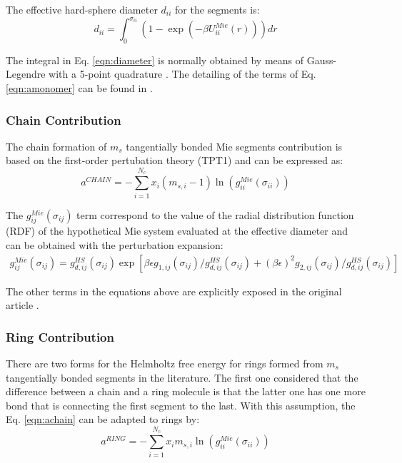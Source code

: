 The effective hard-sphere diameter $d_{ii}$ for the segments is:
\begin{equation}
d_{ii} =\int_{0}^{\sigma_{ii}} ( 1 - \exp(-\beta U^{Mie}_{ii}(r)) ) dr
\label{eqn:diameter}
\end{equation}


The integral in Eq. \eqref{eqn:diameter} is normally obtained by means of Gauss-Legendre with a 5-point quadrature \cite{papa2014}. The detailing of the terms of Eq. \eqref{eqn:amonomer} can be found in .

\subsubsection{Chain Contribution}
The chain formation of $m_{s}$ tangentially bonded Mie segments contribution is based on the first-order pertubation theory (TPT1)  \cite{papa2014} and can be expressed as:
\begin{equation}
a^{CHAIN} =-\sum_{i=1}^{N_{c}} x_{i}(m_{s,i} - 1)\ln(g_{ii}^{Mie}(\sigma_{ii}))
\label{eqn:achain}
\end{equation}


The $g_{ij}^{Mie}(\sigma_{ij})$ term correspond to the value of the radial distribution function (RDF) of the hypothetical Mie system evaluated at the effective diameter and can be obtained with the perturbation expansion:
\begin{equation}
\begin{aligned}
g_{ij}^{Mie}(\sigma_{ij}) =g_{d,ij}^{HS}(\sigma_{ij})\exp[\beta\epsilon g_{1,ij}(\sigma_{ij})/g_{d,ij}^{HS}(\sigma_{ij}) + (\beta\epsilon)^{2} g_{2,ij}(\sigma_{ij})/g_{d,ij}^{HS}(\sigma_{ij})]
\end{aligned}
\label{eqn:gmie}
\end{equation}


The other terms in the equations above are explicitly exposed in the original article \cite{lafitte2013}. 

\subsubsection{Ring Contribution}
There are two forms for the Helmholtz free energy for rings formed from $m_{s}$ tangentially bonded segments in the literature. The first one  \cite{lafitte2012} considered that the difference between a chain and a ring molecule is that the latter one has one more bond that is connecting the first segment to the last. With this assumption, the Eq. \eqref{eqn:achain} can be adapted to rings by:
\begin{equation}
a^{RING} =-\sum_{i=1}^{N_{c}} x_{i}m_{s,i}\ln(g_{ii}^{Mie}(\sigma_{ii}))
\label{eqn:aringlafitte}
\end{equation}

